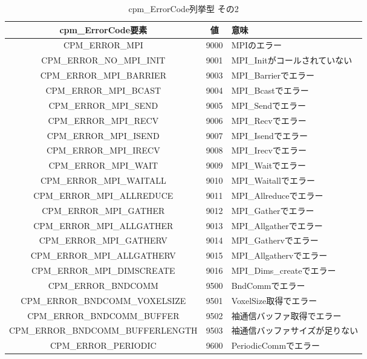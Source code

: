 \begin{itemize}
\begin{table}[htb]
\begin{center}
\caption{cpm\_ErrorCode列挙型 その2}
\label{tbl:ErrorCode2}
\footnotesize
\begin{tabular}{|c|c|l|}
\hline 
cpm\_ErrorCode要素 & 値 & 意味\\
\hline
CPM\_ERROR\_MPI                     & 9000 & MPIのエラー\\
CPM\_ERROR\_NO\_MPI\_INIT           & 9001 & MPI\_Initがコールされていない\\
CPM\_ERROR\_MPI\_BARRIER            & 9003 & MPI\_Barrierでエラー\\
CPM\_ERROR\_MPI\_BCAST              & 9004 & MPI\_Bcastでエラー\\
CPM\_ERROR\_MPI\_SEND               & 9005 & MPI\_Sendでエラー\\
CPM\_ERROR\_MPI\_RECV               & 9006 & MPI\_Recvでエラー\\
CPM\_ERROR\_MPI\_ISEND              & 9007 & MPI\_Isendでエラー\\
CPM\_ERROR\_MPI\_IRECV              & 9008 & MPI\_Irecvでエラー\\
CPM\_ERROR\_MPI\_WAIT               & 9009 & MPI\_Waitでエラー\\
CPM\_ERROR\_MPI\_WAITALL            & 9010 & MPI\_Waitallでエラー\\
CPM\_ERROR\_MPI\_ALLREDUCE          & 9011 & MPI\_Allreduceでエラー\\
CPM\_ERROR\_MPI\_GATHER             & 9012 & MPI\_Gatherでエラー\\
CPM\_ERROR\_MPI\_ALLGATHER          & 9013 & MPI\_Allgatherでエラー\\
CPM\_ERROR\_MPI\_GATHERV            & 9014 & MPI\_Gathervでエラー\\
CPM\_ERROR\_MPI\_ALLGATHERV         & 9015 & MPI\_Allgathervでエラー\\
CPM\_ERROR\_MPI\_DIMSCREATE         & 9016 & MPI\_Dims\_createでエラー\\
CPM\_ERROR\_BNDCOMM                 & 9500 & BndCommでエラー\\
CPM\_ERROR\_BNDCOMM\_VOXELSIZE      & 9501 & VoxelSize取得でエラー\\
CPM\_ERROR\_BNDCOMM\_BUFFER         & 9502 & 袖通信バッファ取得でエラー\\
CPM\_ERROR\_BNDCOMM\_BUFFERLENGTH   & 9503 & 袖通信バッファサイズが足りない\\
CPM\_ERROR\_PERIODIC                & 9600 & PeriodicCommでエラー\\

\end{tabular}
\end{center}
\end{table}
\end{itemize}
